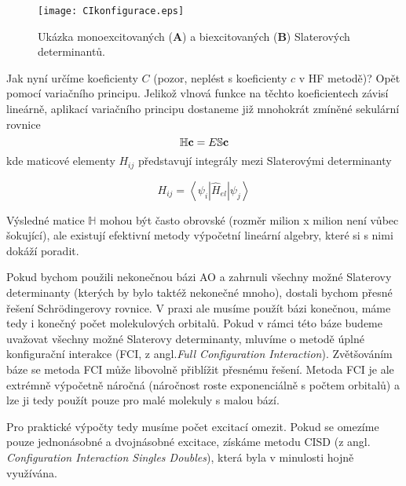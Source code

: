 \begin{figure}
\centering
\texttt{[image: CIkonfigurace.eps]}
\caption[Excitované Slaterovy determinanty]{Ukázka monoexcitovaných (\textbf{A}) a biexcitovaných (\textbf{B}) Slaterových determinantů.}
\label{obr:abinitio:ci}
\end{figure}

Jak nyní určíme koeficienty $C$ (pozor, neplést s koeficienty $c$ v HF metodě)? Opět pomocí variačního principu. Jelikož vlnová funkce na těchto koeficientech závisí lineárně, aplikací variačního principu dostaneme již mnohokrát zmíněné sekulární rovnice
\begin{equation}
\mathbb{H}\mathbf{c}=E\mathbb{S}\mathbf{c} \nonumber \\
\end{equation}
kde maticové elementy $H_{ij}$ představují integrály mezi Slaterovými determinanty

\begin{equation}
H_{ij}= \left\langle \psi_i | \hat{H}_{el} | \psi_j \right\rangle
\end{equation}

Výsledné matice $\mathbb{H}$ mohou být často obrovské (rozměr milion x milion není vůbec šokující), ale existují efektivní metody výpočetní lineární algebry, které si s nimi dokáží poradit.

Pokud bychom použili nekonečnou bázi AO a zahrnuli všechny možné Slaterovy determinanty (kterých by bylo taktéž nekonečné mnoho), dostali bychom přesné řešení Schr\"{o}dingerovy rovnice. V praxi ale musíme použít bázi konečnou, máme tedy i konečný počet molekulových orbitalů. Pokud v rámci této báze budeme uvažovat všechny možné Slaterovy determinanty, mluvíme o metodě úplné konfigurační interakce (FCI, z angl.\textit{Full Configuration Interaction}). Zvětšováním báze se metoda FCI může libovolně přiblížit přesnému řešení. Metoda FCI je ale extrémně výpočetně náročná (náročnost roste exponenciálně s počtem orbitalů) a lze ji tedy použít pouze pro malé molekuly s malou bází.

Pro praktické výpočty tedy musíme počet excitací omezit. Pokud se omezíme pouze jednonásobné a dvojnásobné excitace, získáme metodu CISD (z angl. \textit{Configuration Interaction Singles Doubles}), která byla v minulosti hojně využívána.

